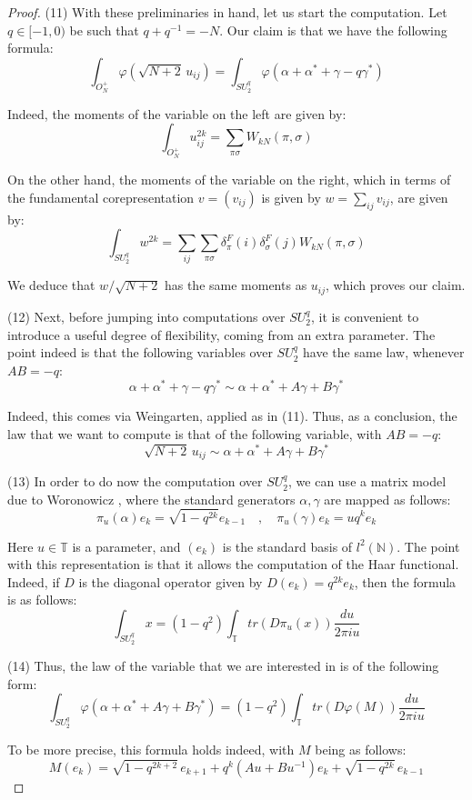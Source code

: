\documentclass[12pt]{amsbook}
\begin{document}
\begin{proof}
(11) With these preliminaries in hand, let us start the computation. Let $q\in [-1,0)$ be such that $q+q^{-1}=-N$. Our claim is that we have the following formula:
$$\int_{O_N^+}\varphi(\sqrt{N+2}\,u_{ij})=\int_{SU^q_2}\varphi(\alpha+\alpha^*+\gamma-q\gamma^*)$$

Indeed, the moments of the variable on the left are given by:
$$\int_{O_N^+}u_{ij}^{2k}=\sum_{\pi\sigma}W_{kN}(\pi,\sigma)$$

On the other hand, the moments of the variable on the right, which in terms of the fundamental corepresentation $v=(v_{ij})$ is given by $w=\sum_{ij}v_{ij}$, are given by:
$$\int_{SU^q_2}w^{2k}=\sum_{ij}\sum_{\pi\sigma}\delta_\pi^F(i)\delta_\sigma^F(j)W_{kN}(\pi,\sigma)$$

We deduce that $w/\sqrt{N+2}$ has the same moments as $u_{ij}$, which proves our claim.

\medskip

(12) Next, before jumping into computations over $SU^q_2$, it is convenient to introduce a useful degree of flexibility, coming from an extra parameter. The point indeed is that the following variables over $SU^q_2$ have the same law, whenever $AB=-q$:
$$\alpha+\alpha^*+\gamma-q\gamma^*\sim \alpha+\alpha^*+A\gamma+B\gamma^*$$

Indeed, this comes via Weingarten, applied as in (11). Thus, as a conclusion, the law that we want to compute is that of the following variable, with  $AB=-q$:
$$\sqrt{N+2}\,u_{ij}\sim \alpha+\alpha^*+A\gamma+B\gamma^*$$

(13) In order to do now the computation over $SU^q_2$, we can use a matrix model due to Woronowicz \cite{wo1}, where the standard generators $\alpha,\gamma$ are mapped as follows:
$$\pi_u(\alpha)e_k=\sqrt{1-q^{2k}}e_{k-1}\quad,\quad 
\pi_u(\gamma)e_k=uq^k e_k$$

Here $u\in\mathbb T$ is a parameter, and $(e_k)$ is the standard basis of $l^2(\mathbb N)$. The point with this representation is that it allows the computation of the Haar functional. Indeed, if $D$ is the diagonal operator given by $D(e_k)=q^{2k}e_k$, then the formula is as follows:
$$\int _{SU^q_2}x=(1-q^2)\int_{\mathbb T}tr(D\pi_u(x))\frac{du}{2\pi iu}$$

(14) Thus, the law of the variable that we are interested in is of the following form:
$$\int_{SU^q_2}\varphi(\alpha+\alpha^*+A\gamma+B\gamma^*)=(1-q^2)\int_{\mathbb T}tr(D\varphi(M))\frac{du}{2\pi iu}$$

To be more precise, this formula holds indeed, with $M$ being as follows:
$$M(e_k)=\sqrt{1-q^{2k+2}}\,e_{k+1}+q^k(Au+Bu^{-1})e_k+\sqrt{1-q^{2k}}\,e_{k-1}$$


\end{proof}
\end{document}
